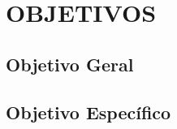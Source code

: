 
\chapter{OBJETIVOS}
\label{chap:objetivos}

\section{Objetivo Geral}



\section{Objetivo Específico}

